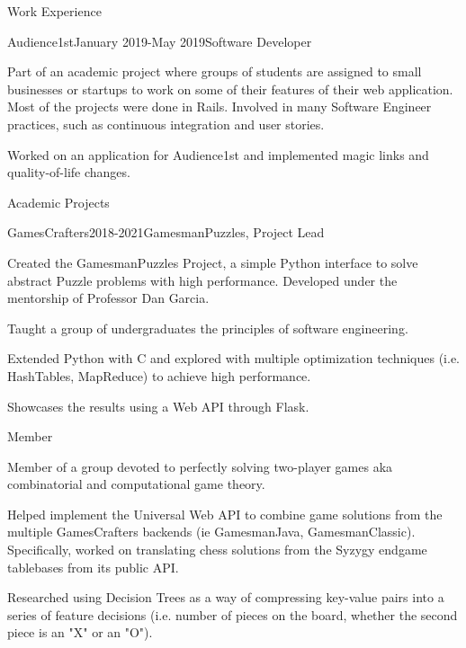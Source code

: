 \documentclass{resume} %
\begin{document}
\begin{rSection}{Work Experience}
\begin{rSubsection}{Audience1st}{January 2019-May 2019}{Software Developer}{}
    \item Part of an academic project where groups of students are assigned to small businesses or startups to work on some of their features of their web application. Most of the projects were done in Rails. Involved in many Software Engineer practices, such as continuous integration and user stories.
    \item Worked on an application for Audience1st and implemented magic links and quality-of-life changes.
\end{rSubsection}

\end{rSection}

\newpage

\begin{rSection}{Academic Projects}

\begin{rSubsection}{GamesCrafters}{2018-2021}{GamesmanPuzzles, Project Lead}{}
	\item Created the GamesmanPuzzles Project, a simple Python interface to solve abstract Puzzle problems with high performance. Developed under the mentorship of Professor Dan Garcia.
	\item Taught a group of undergraduates the principles of software engineering.
	\item Extended Python with C and explored with multiple optimization techniques (i.e. HashTables, MapReduce) to achieve high performance.
	\item Showcases the results using a Web API through Flask.
\end{rSubsection}

\begin{rSubsubsection}{Member}{}
	\item Member of a group devoted to perfectly solving two-player games aka combinatorial and computational game theory.
	\item Helped implement the Universal Web API to combine game solutions from the multiple GamesCrafters backends (ie GamesmanJava, GamesmanClassic). 
	Specifically, worked on translating chess solutions from the Syzygy endgame tablebases from its public API.
	\item Researched using Decision Trees as a way of compressing key-value pairs into a series of feature decisions (i.e. number of pieces on the board, whether the second piece is an "X" or an "O").
\end{rSubsubsection}


\end{rSection}
\end{document}
